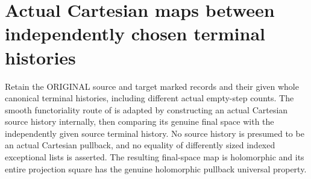 \section{Actual Cartesian maps between independently chosen terminal histories}

Retain the ORIGINAL source and target marked records and their given whole
canonical terminal histories, including different actual empty-step counts.
The smooth functoriality route of \cite{bierstone-milman08-functoriality}
is adapted by constructing an actual Cartesian source history internally,
then comparing its genuine final space with the independently given source
terminal history. No source history is presumed to be an actual Cartesian
pullback, and no equality of differently sized indexed exceptional lists
is asserted. The resulting final-space map is holomorphic and its entire
projection square has the genuine holomorphic pullback universal property.

